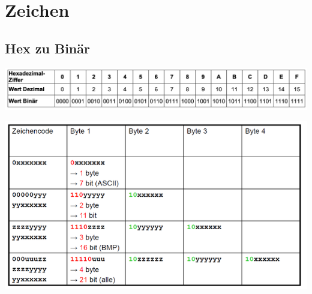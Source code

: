 \section*{Zeichen}
\subsection*{Hex zu Binär}
\begin{center}
	\includegraphics[width=\columnwidth]{images/hextable}
\end{center}

\begin{center}
	\includegraphics[width=\columnwidth]{images/bitesneeded}
\end{center}
